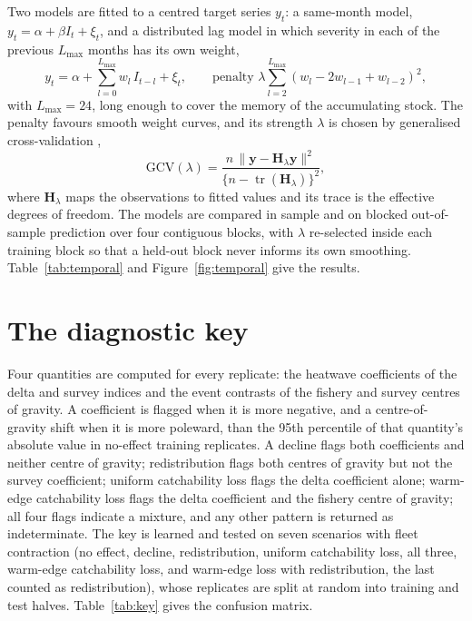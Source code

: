 \documentclass[11pt,a4paper]{article}
\newcommand{\vt}[1]{\text{#1}}
\begin{document}
Two models are fitted to a centred target series $y_t$: a same-month model, $y_t = \alpha + \beta I_t + \xi_t$, and a distributed lag model in which severity in each of the previous $L_{\max}$ months has its own weight,
\begin{equation}
y_t = \alpha + \sum_{l=0}^{L_{\max}} w_l\,I_{t-l} + \xi_t, \qquad \vt{penalty } \lambda\sum_{l=2}^{L_{\max}}\left(w_l - 2w_{l-1} + w_{l-2}\right)^2,
\label{eq:dlag}
\end{equation}
with $L_{\max}=24$, long enough to cover the memory of the accumulating stock. The penalty favours smooth weight curves, and its strength $\lambda$ is chosen by generalised cross-validation \citep{craven1979},
\begin{equation}
\mathrm{GCV}(\lambda) = \frac{n\,\lVert \mathbf{y} - \mathbf{H}_\lambda \mathbf{y}\rVert^2}{\{n - \operatorname{tr}(\mathbf{H}_\lambda)\}^2},
\label{eq:gcv}
\end{equation}
where $\mathbf{H}_\lambda$ maps the observations to fitted values and its trace is the effective degrees of freedom. The models are compared in sample and on blocked out-of-sample prediction over four contiguous blocks, with $\lambda$ re-selected inside each training block so that a held-out block never informs its own smoothing. Table~\ref{tab:temporal} and Figure~\ref{fig:temporal} give the results.

\section{The diagnostic key}
\label{sec:key}

Four quantities are computed for every replicate: the heatwave coefficients of the delta and survey indices and the event contrasts of the fishery and survey centres of gravity. A coefficient is flagged when it is more negative, and a centre-of-gravity shift when it is more poleward, than the 95th percentile of that quantity's absolute value in no-effect training replicates. A decline flags both coefficients and neither centre of gravity; redistribution flags both centres of gravity but not the survey coefficient; uniform catchability loss flags the delta coefficient alone; warm-edge catchability loss flags the delta coefficient and the fishery centre of gravity; all four flags indicate a mixture, and any other pattern is returned as indeterminate. The key is learned and tested on seven scenarios with fleet contraction (no effect, decline, redistribution, uniform catchability loss, all three, warm-edge catchability loss, and warm-edge loss with redistribution, the last counted as redistribution), whose replicates are split at random into training and test halves. Table~\ref{tab:key} gives the confusion matrix.
\end{document}
